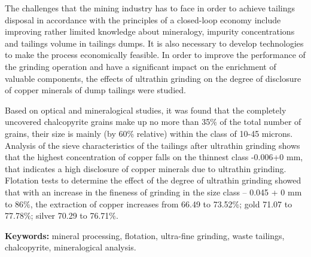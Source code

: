 The challenges that the mining industry has to face in order to achieve
tailings disposal in accordance with the principles of a closed-loop
economy include improving rather limited knowledge about mineralogy,
impurity concentrations and tailings volume in tailings dumps. It is
also necessary to develop technologies to make the process economically
feasible. In order to improve the performance of the grinding operation
and have a significant impact on the enrichment of valuable components,
the effects of ultrathin grinding on the degree of disclosure of copper
minerals of dump tailings were studied.

Based on optical and mineralogical studies, it was found that the
completely uncovered chalcopyrite grains make up no more than 35\% of
the total number of grains, their size is mainly (by 60\% relative)
within the class of 10-45 microns. Analysis of the sieve characteristics
of the tailings after ultrathin grinding shows that the highest
concentration of copper falls on the thinnest class -0.006+0 mm, that
indicates a high disclosure of copper minerals due to ultrathin
grinding. Flotation tests to determine the effect of the degree of
ultrathin grinding showed that with an increase in the fineness of
grinding in the size class -- 0.045 + 0 mm to 86\%, the extraction of
copper increases from 66.49 to 73.52\%; gold 71.07 to 77.78\%; silver
70.29 to 76.71\%.

{\bfseries Keywords:} mineral processing, flotation, ultra-fine grinding,
waste tailings, chalcopyrite, mineralogical analysis.


